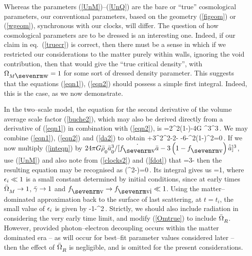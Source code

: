 \documentclass[12pt]{article}
\begin{document}
Whereas the parameters
(\ref{UnM})--(\ref{UnQ}) are the bare or ``true'' cosmological parameters,
our conventional parameters, based on the geometry (\ref{figeom}) or
(\ref{wgeom}), synchronous with our clocks, will differ. The question of
how cosmological parameters are to be dressed is an interesting one.
Indeed, if our claim in eq.\ (\ref{truecr}) is correct, then there
must be a sense in which if we restricted our considerations to the
matter purely within walls, ignoring the void contribution, then that
would give the ``true critical density'', with $\OmMw=1$ for some sort of
dressed density parameter. This suggests that the equations
(\ref{eqn1}), (\ref{eqn2}) should possess a simple first integral. Indeed,
this is the case, as we now demonstrate.

In the two--scale model, the equation for the second derivative of
the volume average scale factor (\ref{buche2}), which may also be derived
directly from a derivative of (\ref{eqn1}) in combination with (\ref{eqn2}),
is
\beq
{\ddot\ab\over\ab}={2\dot\fv^2\fv(1-\fv)}-{4\pi G}{\rhb{}}
{\ab{}^3\over\ab^3}\,.\label{da2}
\eeq
We may combine (\ref{eqn1}), (\ref{eqn2}) and (\ref{da2}) to obtain
+3{\dot\ab^2\over\ab^2}-{2\ddot\fv{}-\fv}
-{6\dot\ab\dot\fv\over\ab\fvf}-{\dot\fv^2\over(1-\fv)^2}=0\,.
\label{inteqn}\eeq
If we now multiply (\ref{inteqn}) by $24\pi G{\rhb\Z0}\ab\Z0^3/[\dot\fv\ab
-3\fvf\dot\ab]^3$, use (\ref{UnM}) and also note from (\ref{clocks2}) and
(\ref{fdot}) that
\beq
\gb={3\fvf\dot\ab{}\fvf\dot\ab-\dot\fv\ab}
\label{gam2}\eeq
then the resulting equation may be recognised as
\beq
\Der\dd\ts\left(\gb^2\OMM{}-\fv\right)=0\,.
\eeq
Its integral gives us
\beq
\OmMw{}=1,
\label{Omtrue}\eeq
where $\epsilon_i\ll1$ is a small constant determined by initial conditions, since
at early times $\OMM\to1$, $\gb\to1$ and $\fv\to\fvi\ll1$. Using the
matter--dominated approximation back to the surface of last scattering,
at $t=t_i$, the small value of $\epsilon_i$ is given by
\beq
{}-{1-\fvi\over\gbi^2\,\Omi}.
\eeq
Strictly, we should also include
radiation in considering the very early time limit, and modify
(\ref{Omtrue}) to include $\OMR$. However, provided
photon--electron decoupling occurs within the matter dominated era -- as will
occur for best--fit parameter values considered later -- then the effect of
$\OMR$ is negligible, and is omitted for the present considerations.
\end{document}
